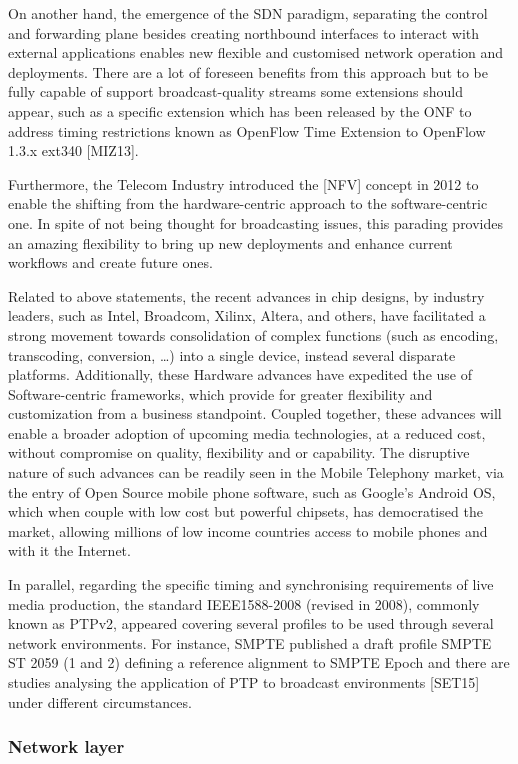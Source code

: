 On another hand, the emergence of the SDN paradigm, separating the control and forwarding plane
besides creating northbound interfaces to interact with external applications enables new flexible and
customised network operation and deployments. There are a lot of foreseen benefits from this
approach but to be fully capable of support broadcast-quality streams some extensions should appear,
such as a specific extension which has been released by the ONF to address timing restrictions known
as OpenFlow Time Extension to OpenFlow 1.3.x ext340 [MIZ13].

Furthermore, the Telecom Industry introduced the [NFV] concept in 2012 to enable the shifting from
the hardware-centric approach to the software-centric one. In spite of not being thought for
broadcasting issues, this parading provides an amazing flexibility to bring up new deployments and
enhance current workflows and create future ones.

Related to above statements, the recent advances in chip designs, by industry leaders, such as Intel,
Broadcom, Xilinx, Altera, and others, have facilitated a strong movement towards consolidation of complex functions (such as encoding, transcoding, conversion, \ldots ) into a single device, instead
several disparate platforms. Additionally, these Hardware advances have expedited the use of
Software-centric frameworks, which provide for greater flexibility and customization from a business
standpoint. Coupled together, these advances will enable a broader adoption of upcoming media
technologies, at a reduced cost, without compromise on quality, flexibility and or capability. The
disruptive nature of such advances can be readily seen in the Mobile Telephony market, via the entry
of Open Source mobile phone software, such as Google’s Android OS, which when couple with low
cost but powerful chipsets, has democratised the market, allowing millions of low income countries
access to mobile phones and with it the Internet.

In parallel, regarding the specific timing and synchronising requirements of live media production,
the standard IEEE1588-2008 (revised in 2008), commonly known as PTPv2, appeared covering
several profiles to be used through several network environments. For instance, SMPTE published a
draft profile SMPTE ST 2059 (1 and 2) defining a reference alignment to SMPTE Epoch and there
are studies analysing the application of PTP to broadcast environments [SET15] under different
circumstances.

\subsubsection{Network layer}

